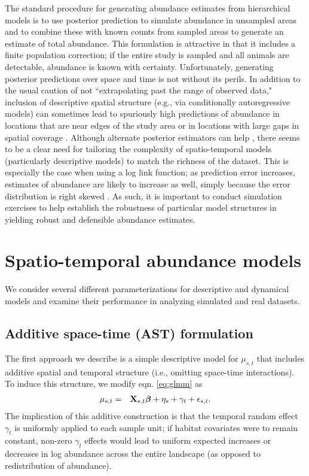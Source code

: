 \documentclass[12pt,english]{article}
\begin{document}
\begin{spacing}{1.9}
The standard procedure for generating abundance estimates from hierarchical models is to use posterior prediction to simulate abundance in unsampled areas and to combine these with known counts from sampled areas \citep{VerHoef2008,JohnsonEtAl2010} to generate an estimate of total abundance.  This formulation is attractive in that it includes a finite population correction; if the entire study is sampled and all animals are detectable, abundance is known with certainty.  Unfortunately, generating posterior predictions over space and time is not without its perils.  In addition to the usual caution of not ``extrapolating past the range of observed data," inclusion of descriptive spatial structure (e.g., via conditionally autoregressive models) can sometimes lead to spuriously high predictions of abundance in locations that are near edges of the study area \citep[edge effects;][]{VerHoefJansen2007} or in locations with large gaps in spatial coverage \citep{ConnEtAl2014}.  Although alternate posterior estimators can help \citep[e.g., the Varian predictor induced by the linex loss function][]{VerHoefJansen2007}, there seems to be a clear need for tailoring the complexity of spatio-temporal models (particularly descriptive models) to match the richness of the dataset.  This is especially the case when using a log link function; as prediction error increases, estimates of abundance are likely to increase as well, simply because the error distribution is right skewed \citep{VerHoef2008}.  As such, it is important to conduct simulation exercises to help establish the robustness of particular model structures in yielding robust and defensible abundance estimates.

\section{Spatio-temporal abundance models}

We consider several different parameterizations for descriptive and dynamical models and examine their performance
in analyzing simulated and real datasets.

\subsection{Additive space-time (AST) formulation}

The first approach we describe is a simple descriptive model for $\mu_{s,t}$ that includes additive spatial and
temporal structure (i.e., omitting space-time interactions).  To induce this structure, we modify eqn. \ref{eq:glmm} as
\begin{eqnarray*}
  \mu_{s,t} & = & {\bf X}_{s,t} \boldsymbol{\beta} + \eta_s + \gamma_t + \epsilon_{s,t}.
\end{eqnarray*}
The implication of this additive construction is that the temporal random effect $\gamma_t$ is uniformly applied to each sample unit; if habitat covariates were to remain constant, non-zero $\gamma_t$ effects would lead to uniform expected increases or decreases in log abundance across the entire landscape (as opposed to redistribution of abundance).


\end{spacing}
\end{document}
